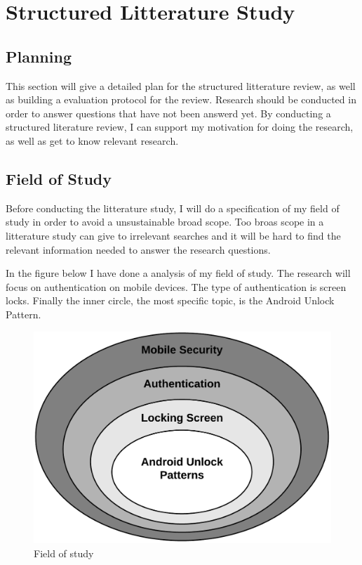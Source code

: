 
\section{Structured Litterature Study}

  \subsection*{Planning}

    This section will give a detailed plan for the structured litterature review, as well as building a 
    evaluation protocol for the review. 
    Research should be conducted in order to answer questions that have not been answerd yet. 
    By conducting a structured literature review, I can support my motivation for doing the research, 
    as well as get to know relevant research. 

    \subsection*{Field of Study}

      Before conducting the litterature study, I will do a specification of my field of study in order to
      avoid a unsustainable broad scope. Too broas scope in a litterature study can give to irrelevant searches 
      and it will be hard to find the relevant information needed to answer the research questions. 

      In the figure below I have done a analysis of my field of study. The research will focus on authentication on mobile devices. 
      The type of authentication is screen locks. Finally the inner circle, the most specific topic, is the Android Unlock Pattern. 

      \begin{figure}[H]
        \centering
        \includegraphics[scale=0.25]{pics/Fieldofstudy.png}
        \caption{Field of study}
      \end{figure}

